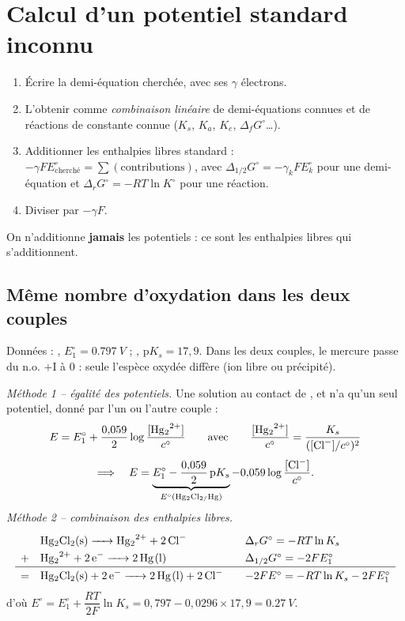 \section{Calcul d'un potentiel standard inconnu}

\begin{methode}
\begin{enumerate}
  \item Écrire la demi-équation cherchée, avec ses $\gamma$ électrons.
  \item L'obtenir comme \emph{combinaison linéaire} de demi-équations connues et de réactions de constante connue ($K_s$, $K_a$, $K_e$, $\Delta_fG^\circ$\dots).
  \item Additionner les enthalpies libres standard : $-\gamma F E^\circ_{\text{cherché}} = \sum(\text{contributions})$, avec $\Delta_{1/2}G^\circ = -\gamma_kFE^\circ_k$ pour une demi-équation et $\Delta_rG^\circ = -RT\ln K^\circ$ pour une réaction.
  \item Diviser par $-\gamma F$.
\end{enumerate}
On n'additionne \textbf{jamais} les potentiels : ce sont les enthalpies libres qui s'additionnent.
\end{methode}

\subsection{Même nombre d'oxydation dans les deux couples}

\begin{exemple}
Données : , $E_1^\circ = \SI{0,797}{V}$ ; , $\mathrm{p}K_s = 17{,}9$. Dans les deux couples, le mercure passe du n.o. $+\mathrm{I}$ à $0$ : seule l'espèce oxydée diffère (ion libre ou précipité).

\medskip
\noindent\emph{Méthode 1 -- égalité des potentiels.} Une solution au contact de ,  et  n'a qu'un seul potentiel, donné par l'un ou l'autre couple :
\[ E = E_1^\circ + \frac{0{,}059}{2}\log\frac{[\ce{Hg2^{2+}}]}{c^\circ} \qquad\text{avec}\qquad \frac{[\ce{Hg2^{2+}}]}{c^\circ} = \frac{K_s}{([\ce{Cl-}]/c^\circ)^2} \]
\[ \Longrightarrow\quad E = \underbrace{E_1^\circ - \frac{0{,}059}{2}\,\mathrm{p}K_s}_{E^\circ(\ce{Hg2Cl2/Hg})} - 0{,}059\log\frac{[\ce{Cl-}]}{c^\circ}. \]
\emph{Méthode 2 -- combinaison des enthalpies libres.}
\[ \renewcommand{\arraystretch}{1.3}\begin{array}{cl@{\qquad}l}
 & \ce{Hg2Cl2(s) -> Hg2^{2+} + 2Cl-} & \Delta_rG^\circ = -RT\ln K_s\\
 + & \ce{Hg2^{2+} + 2e^- -> 2Hg(l)} & \Delta_{1/2}G^\circ = -2FE_1^\circ\\ \hline
 = & \ce{Hg2Cl2(s) + 2e^- -> 2Hg(l) + 2Cl-} & -2FE^\circ = -RT\ln K_s - 2FE_1^\circ
\end{array} \]
d'où $E^\circ = E_1^\circ + \dfrac{RT}{2F}\ln K_s = 0{,}797 - 0{,}0296\times17{,}9 = \SI{0,27}{V}$.
\end{exemple}

